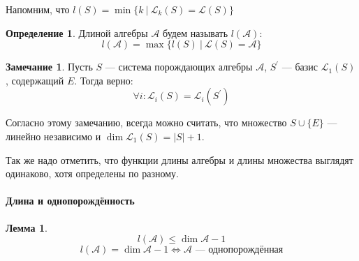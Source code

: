 \documentclass[a4paper, 14pt]{extarticle}
\theoremstyle{definition}
\newtheorem{definition}{Определение}
\newtheorem{note}{Замечание}
\newtheorem{lemma}{Лемма}
\begin{document}
Напомним, что \(l(S) = \operatorname{min} \{k\ |\ \mathcal{L}_k(S) = \mathcal{L}(S)\}\)

\begin{definition}
	Длиной алгебры \(\mathcal{A}\) будем называть \(l(\mathcal{A})\):
	\[l(\mathcal{A}) = \operatorname{max} \{l(S)\ |\ \mathcal{L}(S) =\mathcal{A}\}\]
\end{definition}

\begin{note}
	Пусть \(S\) --- система порождающих алгебры \(\mathcal{A}\), \(S^{\prime}\) --- базис \(\mathcal{L}_1(S)\), содержащий \(E\). Тогда верно:
	\[\forall i: \mathcal{L}_i(S) = \mathcal{L}_i(S^{\prime})\]
\end{note}

Согласно этому замечанию, всегда можно считать, что множество \(S \cup \{E\}\) --- линейно независимо и \(\operatorname{dim} \mathcal{L}_1(S) = |S| + 1\).

Так же надо отметить, что функции длины алгебры и длины множества выглядят одинаково, хотя определены по разному.

\paragraph{Длина и однопорождённость}

\begin{lemma}
	\[l(\mathcal{A}) \leqslant \operatorname{dim} \mathcal{A} - 1\]
	\[l(\mathcal{A}) = \operatorname{dim} \mathcal{A} - 1 \Leftrightarrow \mathcal{A} \text{ --- однопорождённая}\]
\end{lemma}
\end{document}
